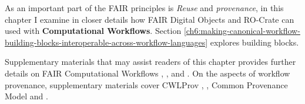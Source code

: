 As an important part of the FAIR principles is \emph{Reuse} and \emph{provenance}, in this chapter I examine in closer details how FAIR Digital Objects and RO-Crate can used with \textbf{Computational Workflows}. 
Section \vref{ch6:making-canonical-workflow-building-blocks-interoperable-across-workflow-languages} explores building blocks.

Supplementary materials that may assist readers of this chapter provides further details on FAIR Computational Workflows \cite{Goble 2020},  \cite{Goble 2021},  \cite{Crusoe 2022} and  \cite{ch6-37}. 
On the aspects of workflow provenance, supplementary materials cover CWLProv \cite{ch5-68},  \cite{De Geest 2022}, Common Provenance Model \cite{Wittner 2020,Wittner 2023} and  \cite{workflow-run-crate}.

